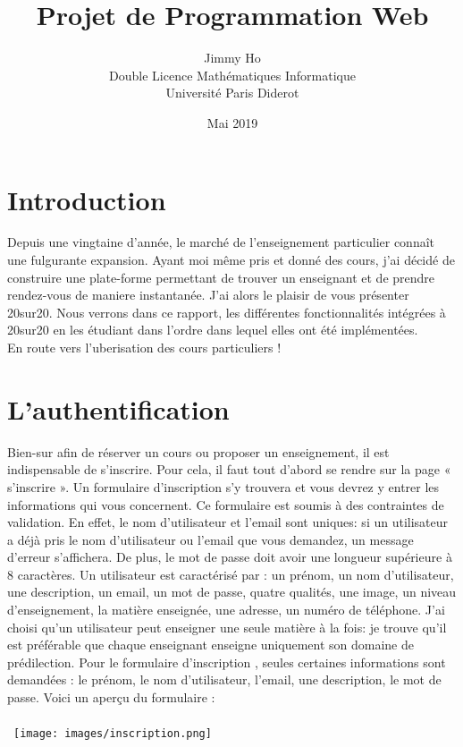 \documentclass{article}%
\title{Projet de Programmation Web}
\date{Mai 2019}
\author{ Jimmy Ho\\ Double Licence Math\'{e}matiques Informatique   \\Universit\'{e} Paris Diderot
}
\begin{document}
\maketitle
\newpage
\section*{Introduction}
Depuis une vingtaine d’année, le marché de l’enseignement particulier connaît une fulgurante expansion. Ayant moi même pris et donné des cours, j’ai décidé de construire une plate-forme permettant de trouver un enseignant et de prendre rendez-vous de maniere instantanée. J’ai alors le plaisir de vous présenter 20sur20. Nous verrons dans ce rapport, les différentes fonctionnalités intégrées à 20sur20 en les étudiant dans l’ordre dans lequel elles ont été implémentées. \\
En route vers l’uberisation des cours particuliers !
\newpage
\section{L'authentification}
Bien-sur afin de réserver un cours ou proposer un enseignement, il est indispensable de s’inscrire.
Pour cela, il faut tout d’abord se rendre sur la page « s’inscrire ». Un formulaire d’inscription s’y trouvera et vous devrez y entrer les informations qui vous concernent. Ce formulaire est soumis à des contraintes de validation. En effet, le nom d’utilisateur et l’email sont uniques: si un utilisateur a déjà pris le nom d’utilisateur ou l’email que vous demandez, un message d’erreur s’affichera. De plus, le mot de passe doit avoir une longueur supérieure à 8 caractères.
Un utilisateur est caractérisé par : un prénom, un nom d’utilisateur, une description, un email, un mot de passe, quatre qualités, une image,  un niveau d'enseignement, la matière enseignée, une adresse, un numéro de téléphone.
J'ai choisi qu'un utilisateur peut enseigner une seule matière à la fois: je trouve qu'il est préférable que chaque enseignant enseigne uniquement son domaine de prédilection.
Pour le formulaire d’inscription , seules certaines informations sont demandées : le prénom, le nom d'utilisateur,  l'email, une description, le mot de passe. Voici un aperçu du formulaire : \\\\\
\texttt{[image: images/inscription.png]}\\
\end{document}
